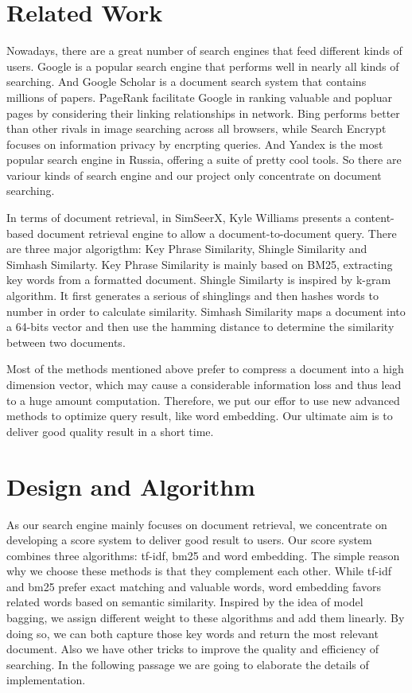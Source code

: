 \documentclass[UTF8]{article}
\begin{document}
	
	
	
	\section{Related Work}
	Nowadays, there are a great number of search engines that feed different kinds of users. Google is a popular search engine that performs well in nearly all kinds of searching. And Google Scholar is a document search system that contains millions of papers. PageRank facilitate Google in ranking valuable and popluar pages by considering their linking relationships in network. Bing performs better than other rivals in image searching across all browsers, while Search Encrypt focuses on information privacy by encrpting queries. And Yandex is the most popular search engine in Russia, offering a suite of pretty cool tools. So there are variour kinds of search engine and our project only concentrate on document searching.
	
	In terms of document retrieval, in SimSeerX, Kyle Williams presents a content-based document retrieval engine to allow a document-to-document query. There are three major algorigthm: Key Phrase Similarity, Shingle Similarity and Simhash Similarty. Key Phrase Similarity is mainly based on BM25, extracting key words from a formatted document. Shingle Similarty is inspired by k-gram algorithm. It first generates a serious of shinglings and then hashes words to number in order to calculate similarity. Simhash Similarity maps a document into a 64-bits vector and then use the hamming distance to determine the similarity between two documents. 
	
	Most of the methods mentioned above prefer to compress a document into a high dimension vector, which may cause a considerable information loss and thus lead to a huge amount computation. Therefore, we put our effor to use new advanced methods to optimize query result, like word embedding. Our ultimate aim is to deliver good quality result in a short time.
	
	
	\section{Design and Algorithm}
	As our search engine mainly focuses on document retrieval, we concentrate on developing a score system to deliver good result to users. Our score system combines three algorithms: tf-idf, bm25 and word embedding. The simple reason why we choose these methods is that they complement each other. While tf-idf and bm25 prefer exact matching and valuable words, word embedding favors related words based on semantic similarity. Inspired by the idea of model bagging, we assign different weight to these algorithms and add them linearly. By doing so, we can both capture those key words and return the most relevant document. Also we have other tricks to improve the quality and efficiency of searching. In the following passage we are going to elaborate the details of implementation.
	
\end{document}
